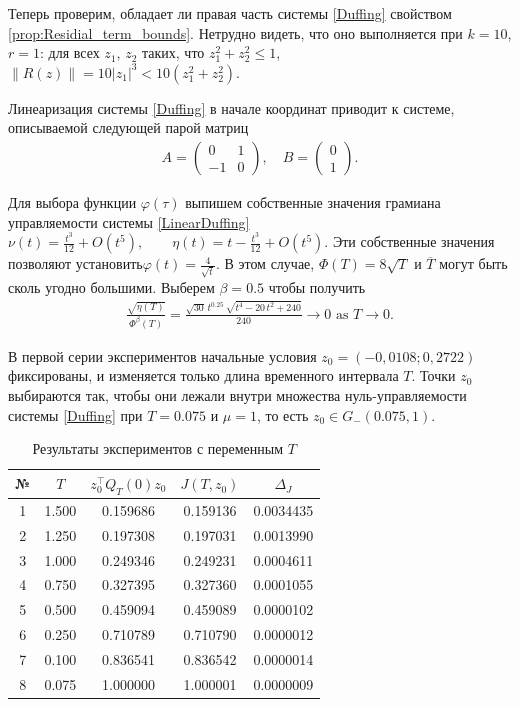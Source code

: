 \documentclass[../main.tex]{subfiles}
\begin{document}
Теперь проверим, обладает ли правая часть системы \eqref{Duffing} свойством \ref{prop:Residial_term_bounds}. 
Нетрудно видеть, что оно выполняется при $k = 10$, $r = 1$: для всех $z_1$, $z_2$ таких, что $z_1^2+z_2^2 \leqslant 1$, $\|R(z)\| = 10|z_1|^3 < 10 (z_1^2+z_2^2)$.

Линеаризация системы \eqref{Duffing} в начале координат приводит к системе, описываемой следующей парой матриц
\begin{gather}\label{LinearDuffing}
A = \begin{pmatrix} 0 & 1\\
                    -1 & 0
    \end{pmatrix}, \quad B = \begin{pmatrix}
    0\\
    1
    \end{pmatrix}.
\end{gather}

Для выбора функции $\varphi(\tau)$ выпишем собственные значения грамиана управляемости системы \eqref{LinearDuffing} $\nu(t) = \frac{t^3}{12} + O(t^5), \qquad \eta(t) = t - \frac{t^3}{12}+ O(t^5)$.
Эти собственные значения позволяют установить$\varphi(t) = \frac{4}{\sqrt{t}}$. 
В этом случае, $\Phi(T) = 8\sqrt{T}$ и $\overline{T}$ могут быть сколь угодно большими. 
Выберем $\beta = 0.5$ чтобы получить 
\begin{gather*}
    \frac{\sqrt{\eta(T)}}{\Phi^\beta(T)} =  \frac{\sqrt{30}\,t^{0.25}\,\sqrt{t^4-20\,t^2+240}}{240} \to 0  \mbox{ as } T \to 0.
\end{gather*} 

В первой серии экспериментов начальные условия $z_0 = (-0,0108; 0,2722)$ 
фиксированы, и изменяется только длина временного интервала $T$.
Точки $z_0 $ выбираются так, чтобы они лежали внутри множества нуль-управляемости системы 
\eqref{Duffing} при $T = 0.075$ и $\mu = 1$, то есть $z_0 \in G_{-}(0.075,1)$.

\begin{table}
\caption{Результаты экспериментов с переменным $T$}
\label{ExampleTable1}
\begin{center}
\begin{tabular}{c|c|c|c|c}
    № & $T$   &  $z_0^{\top} Q_T(0) z_0$   & $ J(T,z_0) $  & $ 
    \Delta_J $   \\ \hline 
    1 & 1.500 & 0.159686  & 0.159136 & 0.0034435   \\ \hline
     2 & 1.250 & 0.197308  & 0.197031 & 0.0013990   \\ \hline
     3 & 1.000 & 0.249346  & 0.249231 & 0.0004611  \\ \hline
     4 & 0.750 & 0.327395  & 0.327360 & 0.0001055   \\ \hline
     5 & 0.500 & 0.459094 & 0.459089 & 0.0000102   \\ \hline
     6 & 0.250 & 0.710789  & 0.710790 & 0.0000012   \\ \hline
     7 & 0.100 & 0.836541  & 0.836542 & 0.0000014   \\ \hline
     8 & 0.075 & 1.000000  & 1.000001 & 0.0000009   \\ \hline
\end{tabular}
\end{center}
\end{table}
\end{document}
